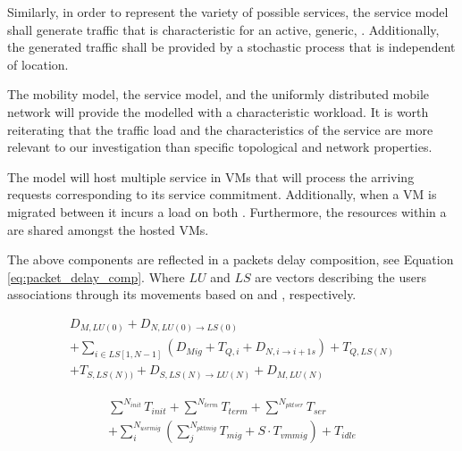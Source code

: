 Similarly, in order to represent the variety of possible services, the service model shall generate traffic that is characteristic for an active, generic, \ue{}. Additionally, the generated traffic shall be provided by a stochastic process that is independent of location.

The mobility model, the service model, and the uniformly distributed mobile network will provide the modelled \dcs{} with a characteristic workload. It is worth reiterating that the traffic load and the characteristics of the service are more relevant to our investigation than specific topological and network properties.

The \dc{} model will host multiple service in VMs that will process the arriving requests corresponding to its service commitment. Additionally, when a VM is migrated between \dcs{} it incurs a load on both \dcs{}. Furthermore, the resources within a \dc{} are shared amongst the hosted VMs. %

The above components are reflected in a packets delay composition, see Equation \ref{eq:packet_delay_comp}. Where $LU$ and $LS$ are vectors describing the users associations through its movements based on \rbs and \dc, respectively.

\begin{multline}
D_{M,LU(0)}+D_{N,LU(0) \rightarrow LS(0)} \\ + \sum_{i \in LS[1,N-1]} \left( D_{Mig} + T_{Q,i} + D_{N,i \rightarrow i+1s} \right) + T_{Q,LS(N)} \\ + T_{S,LS(N))} + D_{S,{LS(N)} \rightarrow LU(N)} + D_{M,LU(N)}
\label{eq:packet_delay_comp}
\end{multline}

\begin{multline}
\sum^{N_{init}} T_{init} + \sum^{N_{term}} T_{term} + \sum^{N_{pktser}} T_{ser}  \\ + \sum_{i}^{N_{usrmig}}  \left( \sum_{j}^{N_{pktmig}}  T_{mig} +S\cdot T_{vmmig} \right ) + T_{idle}
\label{eq:vm_util_comp}
\end{multline}
